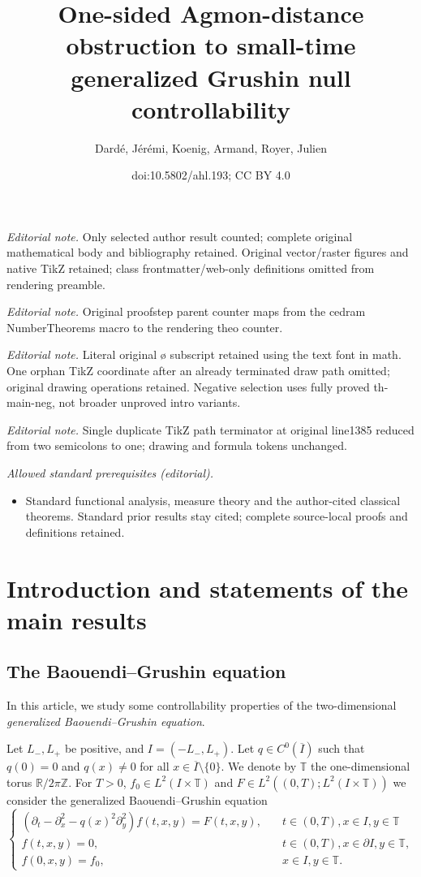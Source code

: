 \documentclass[10pt]{amsart}
\title{One-sided Agmon-distance obstruction to small-time generalized Grushin null controllability}
\author{Dardé, Jérémi, Koenig, Armand, Royer, Julien}
\date{doi:10.5802/ahl.193; CC BY 4.0}
\theoremstyle{definition}\newtheorem{defi}[theo]{Definition}\newtheorem{rema}[theo]{Remark}\newtheorem{exam}[theo]{Example}\newtheorem{exem}[theo]{Example}\newtheorem{nota}[theo]{Notation}
\newcommand{\1}{\mathds 1}
\newcommand{\R}{\mathbb{R}}
\newcommand{\Z}{\mathbb{Z}}
\newcommand{\T}{\mathbb{T}}
\newcounter{proofstep}[theo]
\begin{document}
\maketitle
\noindent\textit{Editorial note.} Only selected author result counted; complete original mathematical body and bibliography retained. Original vector/raster figures and native TikZ retained; class frontmatter/web-only definitions omitted from rendering preamble.\par\medskip
\noindent\textit{Editorial note.} Original proofstep parent counter maps from the cedram NumberTheorems macro to the rendering theo counter.\par\medskip
\noindent\textit{Editorial note.} Literal original ø subscript retained using the text font in math. One orphan TikZ coordinate after an already terminated draw path omitted; original drawing operations retained. Negative selection uses fully proved th-main-neg, not broader unproved intro variants.\par\medskip
\noindent\textit{Editorial note.} Single duplicate TikZ path terminator at original line1385 reduced from two semicolons to one; drawing and formula tokens unchanged.\par\medskip
\noindent\textit{Allowed standard prerequisites (editorial).}\begin{itemize}
\item Standard functional analysis, measure theory and the author-cited classical theorems. Standard prior results stay cited; complete source-local proofs and definitions retained.
\end{itemize}\medskip

\section{Introduction and statements of the main results}

\subsection{The Baouendi--Grushin equation}

In this article, we study some controllability properties of the two-dimensional \emph{generalized Baouendi--Grushin equation}.

Let $L_-,L_+$ be positive, and $I = (-L_-,L_+)$. Let $q \in C^0(\overline I)$ such that $q(0)= 0$ and $q(x) \neq 0$ for all $x \in \overline I\setminus \{0\}$. We denote by $\T$ the one-dimensional torus $\R/2\pi \Z$. For $T > 0$, $f_0 \in L^2(I\times \T)$ and $F \in L^2((0,T);L^2(I \times \T))$ we consider the generalized Baouendi--Grushin equation
\begin{equation}\label{eq-grushin-gen-intro}
\left\{
\begin{array}{ll}
\left(\partial_t-\partial_x^2 - q(x)^2 \partial_y^2\right)f(t,x,y) = F(t,x,y),&\quad t\in (0,T), x\in I, y\in \T\\
f(t,x,y) = 0,&\quad t\in (0,T), x \in \partial I, y\in \T, \\
f(0,x,y) = f_0, & \quad x\in I, y\in \T.
\end{array}\right.
\end{equation}
\end{document}
